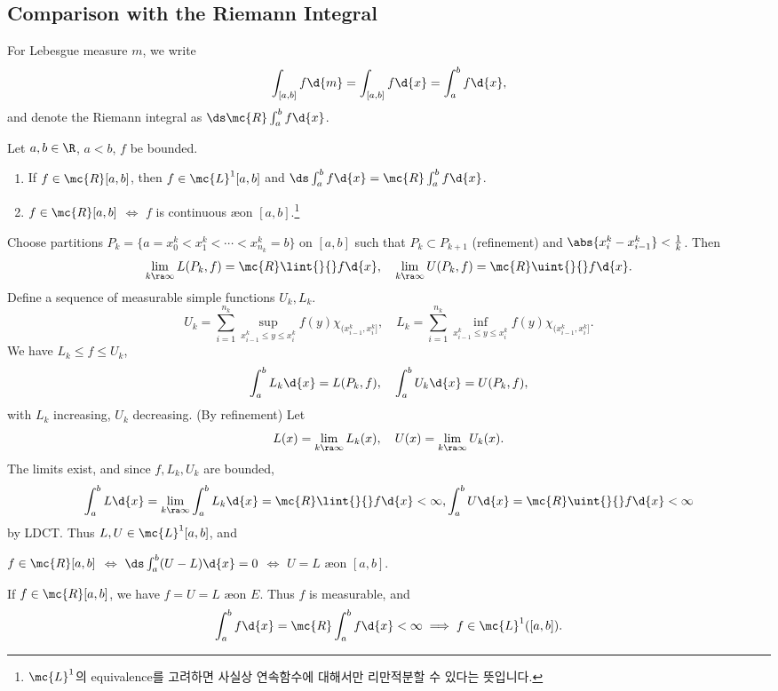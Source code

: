 \subsection*{Comparison with the Riemann Integral}

For Lebesgue measure \(m\), we write
\[
    \int_{[a, b]} f \d{m} = \int_{[a, b]} f \d{x} = \int_a^b f \d{x},
\]
and denote the Riemann integral as \(\ds \mc{R}\int_a^b f\d{x}\).

 Let \(a, b \in \R\), \(a < b\), \(f\) be bounded.
\begin{enumerate}
    \item If \(f \in \mc{R}[a, b]\), then \(f \in \mc{L}^{1}[a, b]\) and \(\ds \int_a^b f\d{x} = \mc{R}\int_a^b f \d{x}\).
    \item \(f \in \mc{R}[a, b]\) \(\iff\) \(f\) is continuous \ae on \([a, b]\).\footnote{\(\mc{L}^{1}\)의 equivalence를 고려하면 사실상 연속함수에 대해서만 리만적분할 수 있다는 뜻입니다.}
\end{enumerate}

\pf Choose partitions \(P_k = \{a = x_0^k < x_1^k < \cdots < x_{n_k}^k = b\}\) on \([a, b]\) such that \(P_k \subset P_{k+1}\) (refinement) and \(\abs{x_{i}^k - x_{i-1}^k} < \frac{1}{k}\). Then
\[
    \lim_{k \ra \infty} L(P_k, f) = \mc{R}\lint{}{} f\d{x}, \quad \lim_{k \ra \infty} U(P_k, f) = \mc{R} \uint{}{} f \d{x}.
\]
Define a sequence of measurable simple functions \(U_k, L_k\).
\[
    U_k = \sum_{i=1}^{n_k} \sup_{x_{i-1}^k \leq y \leq x_{i}^k} f(y) \chi_{(x_{i-1}^k, x_i^k]}, \quad L_k = \sum_{i=1}^{n_k} \inf_{x_{i-1}^k \leq y \leq x_{i}^k} f(y) \chi_{(x_{i-1}^k, x_i^k]}.
\]
We have \(L_k \leq f \leq U_k\),
\[
    \int_a^b L_k \d{x} = L(P_k, f), \quad \int_a^b U_k \d{x} = U(P_k, f),
\]
with \(L_k\) increasing, \(U_k\) decreasing. (By refinement) Let
\[
    L(x) = \lim_{k \ra \infty} L_k(x), \quad U(x) = \lim_{k \ra \infty} U_k(x).
\]
The limits exist, and since \(f, L_k, U_k\) are bounded,
\[
    \int_a^b L \d{x} = \lim_{k \ra \infty} \int_a^b L_k \d{x} = \mc{R}\lint{}{} f\d{x} < \infty, \int_a^b U\d{x} = \mc{R} \uint{}{} f \d{x} < \infty
\]
by LDCT. Thus \(L, U \in \mc{L}^{1}[a, b]\), and
\begin{center}
    \(f \in \mc{R}[a, b]\) \(\iff\) \(\ds \int_a^b (U - L)\d{x} = 0\) \(\iff\) \(U = L\) \ae on \([a, b]\).
\end{center}

 If \(f \in \mc{R}[a, b]\), we have \(f = U = L\) \ae on \(E\). Thus \(f\) is measurable, and
\[
    \int_a^b f \d{x} = \mc{R}\int_a^b f\d{x} < \infty \implies f \in \mc{L}^{1}([a, b]).
\]


